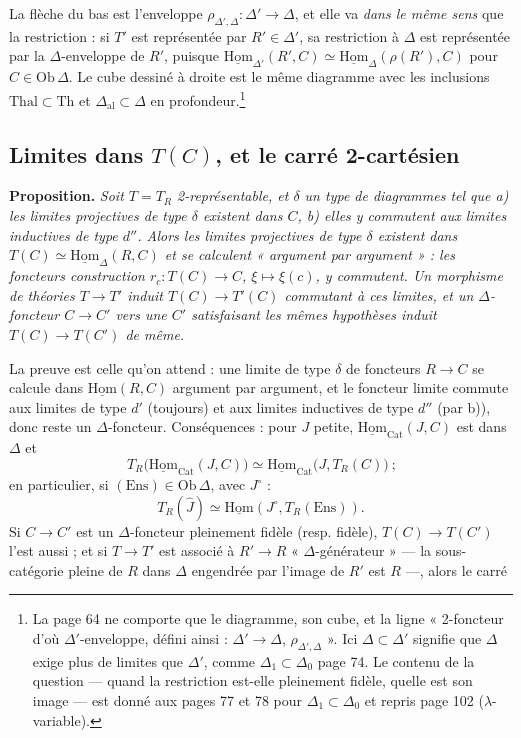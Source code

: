 \documentclass[11pt,a4paper]{article}
\begin{document}
La flèche du bas est l'enveloppe $\rho_{\Delta',\Delta} : \Delta' \to
\Delta$, et elle va \emph{dans le même sens} que la restriction : si $T'$
est représentée par $R' \in \Delta'$, sa restriction à $\Delta$ est
représentée par la $\Delta$-enveloppe de $R'$, puisque
$\underline{\mathrm{Hom}}_{\Delta'}(R', C) \simeq \underline{\mathrm{Hom}}_{\Delta}
(\rho(R'), C)$ pour $C \in \mathrm{Ob}\,\Delta$. Le cube dessiné à droite
est le même diagramme avec les inclusions $\mathrm{Thal} \subset \mathrm{Th}$
et $\Delta_{\mathrm{al}} \subset \Delta$ en profondeur.\footnote{La page 64
ne comporte que le diagramme, son cube, et la ligne « 2-foncteur d'où
$\Delta'$-enveloppe, défini ainsi : $\Delta' \to \Delta$,
$\rho_{\Delta',\Delta}$ ». Ici $\Delta \subset \Delta'$ signifie que
$\Delta$ exige plus de limites que $\Delta'$, comme $\Delta_{1} \subset
\Delta_{0}$ page 74. Le contenu de la question — quand la restriction
est-elle pleinement fidèle, quelle est son image — est donné aux pages 77
et 78 pour $\Delta_{1} \subset \Delta_{0}$ et repris page 102
($\lambda$-variable).}

\subsection*{Limites dans $T(C)$, et le carré 2-cartésien}

\textbf{Proposition.} \emph{Soit $T = T_{R}$ 2-représentable, et $\delta$ un
type de diagrammes tel que a) les limites projectives de type $\delta$
existent dans $C$, b) elles y commutent aux limites inductives de type
$d''$. Alors les limites projectives de type $\delta$ existent dans $T(C)
\simeq \underline{\mathrm{Hom}}_{\Delta}(R, C)$ et se calculent « argument
par argument » : les foncteurs construction $r_{c} : T(C) \to C$, $\xi
\mapsto \xi(c)$, y commutent. Un morphisme de théories $T \to T'$ induit
$T(C) \to T'(C)$ commutant à ces limites, et un $\Delta$-foncteur $C \to C'$
vers une $C'$ satisfaisant les mêmes hypothèses induit $T(C) \to T(C')$ de
même.}

La preuve est celle qu'on attend : une limite de type $\delta$ de
foncteurs $R \to C$ se calcule dans $\underline{\mathrm{Hom}}(R, C)$
argument par argument, et le foncteur limite commute aux limites de type
$d'$ (toujours) et aux limites inductives de type $d''$ (par b)), donc reste
un $\Delta$-foncteur. Conséquences : pour $J$ petite,
$\underline{\mathrm{Hom}}_{\mathrm{Cat}}(J, C)$ est dans $\Delta$ et
\[
\boxed{\ T_{R}\bigl(\underline{\mathrm{Hom}}_{\mathrm{Cat}}(J, C)\bigr)
\simeq \underline{\mathrm{Hom}}_{\mathrm{Cat}}\bigl(J, T_{R}(C)\bigr)\ } ;
\]
en particulier, si $(\mathrm{Ens}) \in \mathrm{Ob}\,\Delta$, avec $J^{\circ}$ :
\[
T_{R}(\widehat{J}) \simeq \underline{\mathrm{Hom}}(J^{\circ}, T_{R}(\mathrm{Ens})).
\]
Si $C \to C'$ est un $\Delta$-foncteur pleinement fidèle (resp. fidèle),
$T(C) \to T(C')$ l'est aussi ; et si $T \to T'$ est associé à $R' \to R$
« $\Delta$-générateur » — la sous-catégorie pleine de $R$ dans $\Delta$
engendrée par l'image de $R'$ est $R$ —, alors le carré
\end{document}
